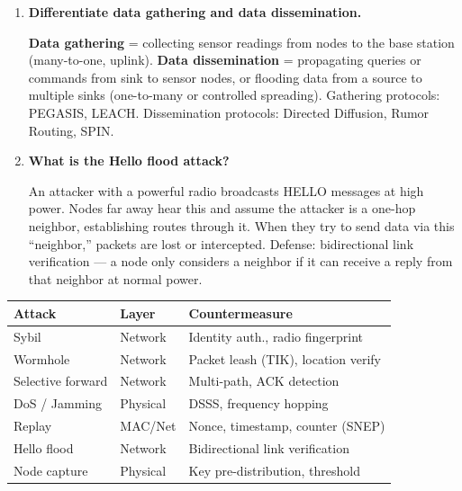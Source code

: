 \documentclass[12pt,a4paper]{article}
\newcommand{\Q}[1]{\textbf{#1}\par\noindent\ignorespaces}
\renewcommand{\arraystretch}{1.45}
\begin{document}
\begin{tcolorbox}[exambox, title={\textbf{Frequently Asked / Viva Questions}}]
\begin{enumerate}[topsep=0pt, label=\textbf{Q\arabic*.}, itemsep=5pt]
  \item \Q{Differentiate data gathering and data dissemination.}
  \textbf{Data gathering} = collecting sensor readings from nodes to the base station (many-to-one, uplink). \textbf{Data dissemination} = propagating queries or commands from sink to sensor nodes, or flooding data from a source to multiple sinks (one-to-many or controlled spreading). Gathering protocols: PEGASIS, LEACH. Dissemination protocols: Directed Diffusion, Rumor Routing, SPIN.

  \item \Q{What is the Hello flood attack?}
  An attacker with a powerful radio broadcasts HELLO messages at high power. Nodes far away hear this and assume the attacker is a one-hop neighbor, establishing routes through it. When they try to send data via this ``neighbor,'' packets are lost or intercepted. Defense: bidirectional link verification --- a node only considers a neighbor if it can receive a reply from that neighbor at normal power.
\end{enumerate}
\end{tcolorbox}

\begin{tcolorbox}[tikzbox, title={\textbf{Summary: WSN Security Threats and Countermeasures}}]
\par\noindent
{\renewcommand{\arraystretch}{1.4}%
\begin{tabularx}{\linewidth}{|B{2.8cm}|Y|Y|}
\hline
\textbf{Attack} & \textbf{Layer} & \textbf{Countermeasure} \\
\hline
Sybil & Network & Identity auth., radio fingerprint \\
\hline
Wormhole & Network & Packet leash (TIK), location verify \\
\hline
Selective forward & Network & Multi-path, ACK detection \\
\hline
DoS / Jamming & Physical & DSSS, frequency hopping \\
\hline
Replay & MAC/Net & Nonce, timestamp, counter (SNEP) \\
\hline
Hello flood & Network & Bidirectional link verification \\
\hline
Node capture & Physical & Key pre-distribution, threshold \\
\hline
\end{tabularx}}
\end{tcolorbox}
\end{document}
